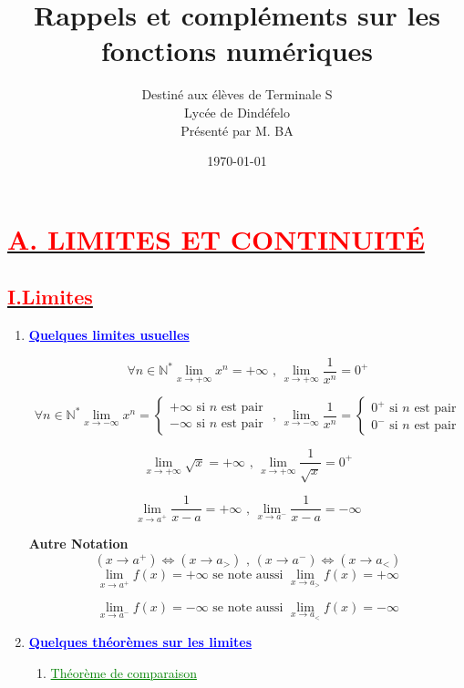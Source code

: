 \documentclass[12pt]{article}
\author{Destiné aux élèves de Terminale S\\Lycée de Dindéfelo\\Présenté par M. BA}
\title{\textbf{Rappels et compléments sur les fonctions numériques}}
\date{\today}
\begin{document}
\maketitle
\section*{\underline{\textbf{\textcolor{red}{A. LIMITES ET CONTINUITÉ}}}}
\subsection*{\underline{\textbf{\textcolor{red}{I.Limites}}}}

\renewcommand{\labelenumi}{\theenumi)}
\begin{enumerate}[label=\arabic*)]
    \item \textbf{\textcolor{blue}{\underline{Quelques limites usuelles}}}
    
\[\forall n\in\mathbb{N}^{*} \lim_{x \to +\infty} x^{n}=+\infty  \text{ , } \lim_{x \to +\infty} \frac{1}{x^{n}}=0^{+}  \]

\[ \forall n\in\mathbb{N}^{*}
 \lim_{x \to -\infty} x^{n} =
 \begin{cases} 
 +\infty \text{ si \(n\) est pair}\\
 -\infty \text{ si \(n\) est pair}
 \end{cases}
\text{ , }
\lim_{x \to -\infty} \frac{1}{x^{n}}=
 \begin{cases} 
 0^{+} \text{ si \(n\) est pair}\\
 0^{-} \text{ si \(n\) est pair}
 \end{cases}
\]

\[ \lim_{x \to +\infty} \sqrt{x}=+\infty \text{ , } \lim_{x \to +\infty} \frac{1}{\sqrt{x}}=0^{+}  \]

\[ \lim_{x \to a^{+}} \frac{1}{x-a}=+\infty \text{ , } \lim_{x \to a^{-}} \frac{1}{x-a}=-\infty  \]

		\textbf{Autre Notation}
\[( x\rightarrow a^{+} ) \Leftrightarrow ( x\rightarrow a_{>} ) \text{ , } ( x\rightarrow a^{-} ) \Leftrightarrow ( x\rightarrow a_{<} ) \]
\[ \lim_{x \to a^{+}} f(x)=+\infty \text{ se note aussi } \lim_{x \to a_{>}} f(x)=+\infty  \]	

\[ \lim_{x \to a^{-}} f(x)=-\infty \text{ se note aussi } \lim_{x \to a_{<}} f(x)=-\infty  \]	
    
    \item	\textbf{\textcolor{blue}{\underline{Quelques théorèmes sur les limites}}}
\begin{enumerate}[label=\alph*)]
       \item \textcolor{green}{\underline{Théorème de comparaison}}
       

\end{enumerate}
\end{enumerate}
\end{document}
